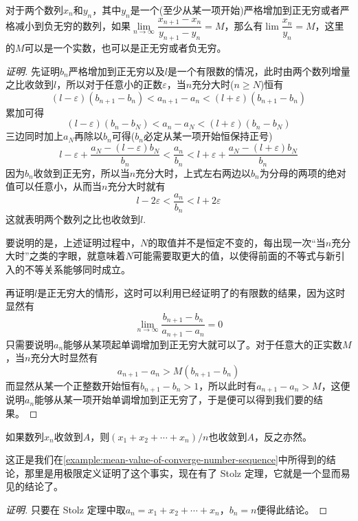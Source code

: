 \begin{theorem}[Stolz 定理]
  对于两个数列$x_n$和$y_n$，其中$y_n$是一个(至少从某一项开始)严格增加到正无穷或者严格减小到负无穷的数列，如果$\lim\limits_{n\to\infty}\dfrac{x_{n+1}-x_n}{y_{n+1}-y_n} = M$，那么有$\lim\limits \dfrac{x_n}{y_n} = M$，这里的$M$可以是一个实数，也可以是正无穷或者负无穷。
\end{theorem}

\begin{proof}[证明]
  先证明$b_n$严格增加到正无穷以及$l$是一个有限数的情况，此时由两个数列增量之比收敛到$l$，所以对于任意小的正数$\varepsilon$，当$n$充分大时($n \geqslant N$)恒有
  \[ (l-\varepsilon)(b_{n+1}-b_n) < a_{n+1}-a_n < (l+\varepsilon)(b_{n+1}-b_n) \]
  累加可得
  \[ (l-\varepsilon)(b_{n}-b_N) < a_{n}-a_N < (l+\varepsilon)(b_{n}-b_N) \]
  三边同时加上$a_N$再除以$b_n$可得($b_n$必定从某一项开始恒保持正号)
  \[ l-\varepsilon+\frac{a_N-(l-\varepsilon)b_N}{b_n} < \frac{a_n}{b_n} < l+\varepsilon+\frac{a_N-(l+\varepsilon)b_N}{b_n}\]
  因为$b_n$收敛到正无穷，所以当$n$充分大时，上式左右两边以$b_n$为分母的两项的绝对值可以任意小，从而当$n$充分大时就有
  \[ l-2\varepsilon < \frac{a_n}{b_n} < l + 2\varepsilon \]
  这就表明两个数列之比也收敛到$l$.

  要说明的是，上述证明过程中，$N$的取值并不是恒定不变的，每出现一次“当$n$充分大时”之类的字眼，就意味着$N$可能需要取更大的值，以使得前面的不等式与新引入的不等关系能够同时成立。

  再证明$l$是正无穷大的情形，这时可以利用已经证明了的有限数的结果，因为这时显然有
  \[ \lim_{n \to \infty} \frac{b_{n+1}-b_n}{a_{n+1}-a_n} = 0 \]
  只需要说明$a_n$能够从某项起单调增加到正无穷大就可以了。对于任意大的正实数$M$，当$n$充分大时显然有
  \[ a_{n+1}-a_n > M(b_{n+1}-b_n) \]
  而显然从某一个正整数开始恒有$b_{n+1}-b_n>1$，所以此时有$a_{n+1}-a_n>M$，这便说明$a_n$能够从某一项开始单调增加到正无穷了，于是便可以得到我们要的结果。
\end{proof}

\begin{inference}
  如果数列$x_n$收敛到$A$，则$(x_1+x_2+\cdots+x_n)/n$也收敛到$A$，反之亦然。
\end{inference}

这正是我们在\autoref{example:mean-value-of-converge-number-sequence}中所得到的结论，那里是用极限定义证明了这个事实，现在有了 Stolz 定理，它就是一个显而易见的结论了。

\begin{proof}[证明]
  只要在 Stolz 定理中取$a_n=x_1+x_2+\cdots+x_n$，$b_n=n$便得此结论。
\end{proof}

